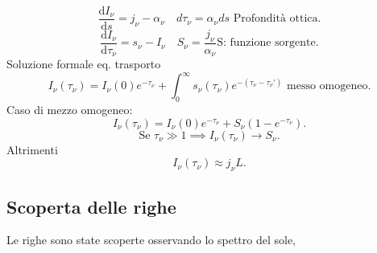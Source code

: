 \[
	\frac{\mbox{d} I_{\nu} }{\mbox{d} s} = j _{\nu} -\alpha _{\nu} \quad d\tau _{\nu} = \alpha _{\nu} ds \text{ Profondità ottica}
.\] 
\[
	\frac{\mbox{d} I_{\nu} }{\mbox{d} \tau _{\nu} } = s_{\nu} - I_{\nu} \quad S_{\nu} = \frac{j _{\nu} }{\alpha _{\nu} } \text{S: funzione sorgente}
.\] 
Soluzione formale eq. trasporto
\[
	I_{\nu} ( \tau _{\nu} ) = I_{\nu} ( 0) e^{-\tau _{\nu} } + \int_{0}^{\infty} s_{\nu} ( \tau _{\nu} ) e^{-\left( \tau _{\nu} -\tau _{\nu} ' \right) }
	\text{ messo omogeneo}
.\] 
Caso di mezzo omogeneo:
\[
	I_{\nu} ( \tau _{\nu} ) = I_{\nu} ( 0) e^{-\tau _{\nu} } + S_{\nu} \left( 1- e^{-\tau _{\nu} } \right) 
.\] 
\[
	\text{Se } \tau _{\nu} \gg 1 \implies I_{\nu} ( \tau _{\nu} ) \to S_{\nu} 
.\] 
Altrimenti
\[
	I_{\nu} ( \tau _{\nu} )  \approx j _{\nu} L
.\] 
\subsection{Scoperta delle righe}%
Le righe sono state scoperte osservando lo spettro del sole, 


